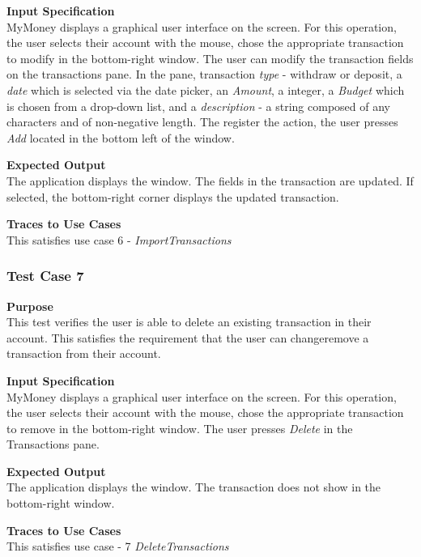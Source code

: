 \documentclass[12pt]{article}
\begin{document}
\noindent
{\bf Input Specification}\\
MyMoney displays a graphical user interface on the screen.
For this operation, the user selects their account with the mouse,
chose the appropriate transaction to modify in the bottom-right window.
The user can modify the transaction fields on the transactions pane.
In the pane, transaction \textit{type} - withdraw or deposit, a \textit{date}
which is selected via the date picker, an \textit{Amount}, a integer, a \textit{Budget} which is chosen
from a drop-down list, and a \textit{description} - a string composed of any characters and
of non-negative length. The register the action, the user presses \textit{Add} located in the bottom left
of the window.   
                                                          

\noindent
{\bf Expected Output}\\
The application displays the window.    
The fields in the transaction are updated.
If selected, the bottom-right corner displays the updated transaction.

\noindent
    {\bf Traces to Use Cases}\\
    This satisfies use case 6 - \textit{ImportTransactions}


\clearpage %
\subsubsection{Test Case 7} \label{TC-7}
\noindent
{\bf Purpose}\\
This test verifies the user is able to delete an existing transaction in their account.
This satisfies the requirement that the user can changeremove a transaction from their account.
                                                        
\noindent
{\bf Input Specification}\\
MyMoney displays a graphical user interface on the screen.
For this operation, the user selects their account with the mouse,
chose the appropriate transaction to remove in the bottom-right window.
The user presses \textit{Delete} in the Transactions pane.
                                                          

\noindent
{\bf Expected Output}\\
The application displays the window.       
The transaction does not show in the bottom-right window.

\noindent
{\bf Traces to Use Cases}\\
This satisfies use case  - 7 \textit{DeleteTransactions}
\end{document}
